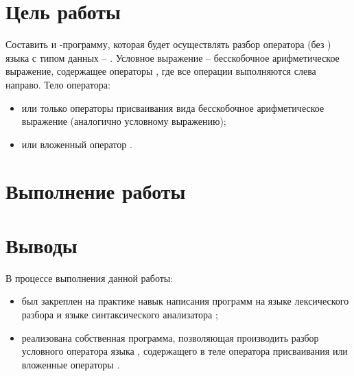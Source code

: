 





\tableofcontents
\newpage

\section{Цель работы}

Составить  и -программу, которая будет осуществлять разбор оператора  (без ) языка  с типом данных -- . Условное выражение -- бесскобочное арифметическое выражение, содержащее операторы \code{+ - * /}, где все операции выполняются слева направо. Тело оператора:
\begin{itemize}
	\item или только операторы присваивания вида  бесскобочное арифметическое выражение (аналогично условному выражению);
	\item или вложенный оператор .
\end{itemize}

\section{Выполнение работы}

\section{Выводы}

В процессе выполнения данной работы:

\begin{itemize}
	\item был закреплен на практике навык написания программ на языке лексического разбора  и языке синтаксического анализатора ;
	\item реализована собственная программа, позволяющая производить разбор условного оператора  языка , содержащего в теле оператора присваивания или вложенные операторы .
\end{itemize}


